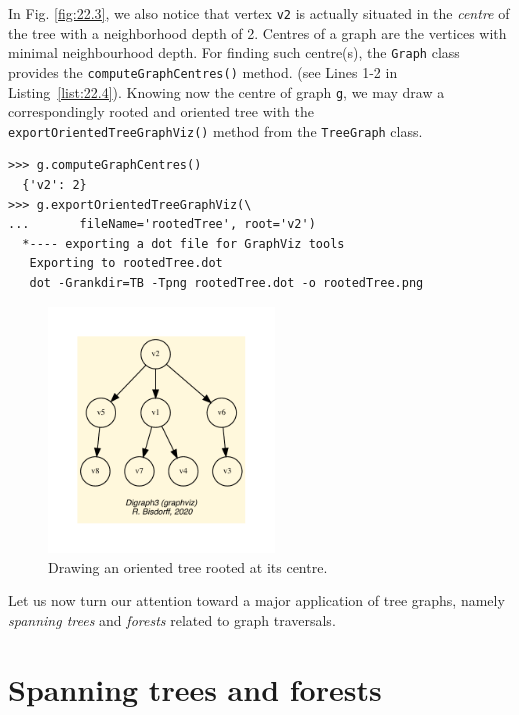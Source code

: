 In Fig. \ref{fig:22.3}, we also notice that vertex \texttt{v2} is actually situated in the \emph{centre} of the tree with a neighborhood depth of 2. Centres of a graph are the vertices with minimal neighbourhood depth. For finding such centre(s), the \texttt{Graph} class provides the \texttt{computeGraphCentres()} method. (see Lines 1-2 in Listing~\ref{list:22.4}). Knowing now the centre of graph \texttt{g}, we may draw a correspondingly rooted and oriented tree with the \texttt{exportOrientedTreeGraphViz()} method from the \texttt{TreeGraph} class.  
\begin{lstlisting}[caption={Computing the centres of a tree and drawing a rooted and oriented tree.},label=list:22.4]
>>> g.computeGraphCentres()
  {'v2': 2}
>>> g.exportOrientedTreeGraphViz(\
...       fileName='rootedTree', root='v2')
  *---- exporting a dot file for GraphViz tools
   Exporting to rootedTree.dot
   dot -Grankdir=TB -Tpng rootedTree.dot -o rootedTree.png
\end{lstlisting}
\begin{figure}[h]
\sidecaption[t]
\includegraphics[width=6cm]{Figures/rootedTree.pdf}
\caption{Drawing an oriented tree rooted at its centre.} 
\label{fig:22.4}       %
\end{figure}

Let us now turn our attention toward a major application of tree graphs, namely \emph{spanning trees} and \emph{forests} related to graph traversals.

\section{Spanning trees and forests}
\label{sec:22.2}

